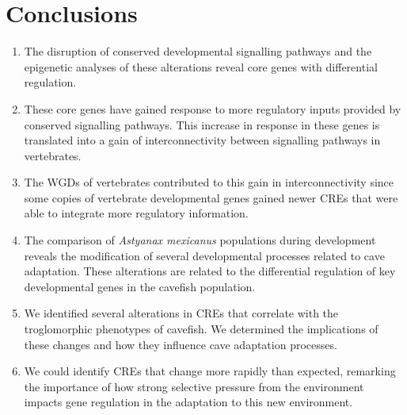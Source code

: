 \chapter{Conclusions}

\begin{enumerate}
    \item The disruption of conserved developmental signalling pathways and the epigenetic analyses of these alterations reveal core genes with differential regulation.
    \item These core genes have gained response to more regulatory inputs provided by conserved signalling pathways. This increase in response in these genes is translated into a gain of interconnectivity between signalling pathways in vertebrates.
    \item The WGDs of vertebrates contributed to this gain in interconnectivity since some copies of vertebrate developmental genes gained newer CREs that were able to integrate more regulatory information.
    \item The comparison of \textit{Astyanax mexicanus} populations during development reveals the modification of several developmental processes related to cave adaptation. These alterations are related to the differential regulation of key developmental genes in the cavefish population.
    \item We identified several alterations in CREs that correlate with the troglomorphic phenotypes of cavefish. We determined the implications of these changes and how they influence cave adaptation processes.
    \item We could identify CREs that change more rapidly than expected, remarking the importance of how strong selective pressure from the environment impacts gene regulation in the adaptation to this new environment.
\end{enumerate}